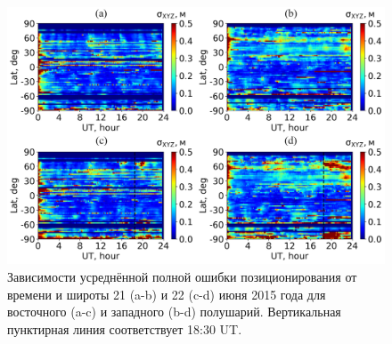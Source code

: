 \begin{figure}[h]
\includegraphics[width=\textwidth]{fig/2015-172-173.png}    
\caption{Зависимости усреднённой полной ошибки позиционирования от времени и широты 21 (a-b) и 22 (c-d) июня 2015 года для восточного (a-c) и западного (b-d) полушарий. Вертикальная пунктирная линия соответствует 18:30 UT.} 
\label{fig-2015-172-173}      
\end{figure} 
